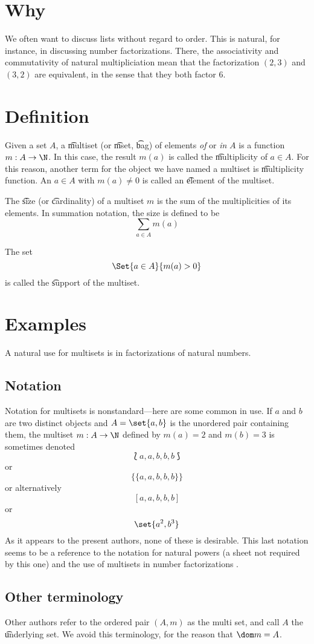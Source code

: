 
\section*{Why}

We often want to discuss lists without regard to order.
This is natural, for instance, in discussing number factorizations.
There, the associativity and commutativity of natural multipliciation mean that the factorization $(2, 3)$ and $(3,2)$ are equivalent, in the sense that they both factor 6.

\section*{Definition}

Given a set $A$, a \t{multiset} (or \t{mset}, \t{bag}) of elements \textit{of} or \textit{in} $A$ is a function $m: A \to \N  $.
In this case, the result $m(a)$ is called the \t{multiplicity} of $a \in A$.
For this reason, another term for the object we have named a multiset is \t{multiplicity function}.
An $a \in A$ with $m(a) \neq 0$ is called an \t{element} of the multiset.

The \t{size} (or \t{cardinality}) of a multiset $m$ is the sum of the multiplicities of its elements.
In summation notation, the size is defined to be
\[
\sum_{a \in A} m(a)
\]

The set
\[
\Set{a \in A}{m(a) > 0}
\]
is called the \t{support} of the multiset.

\section*{Examples}

A natural use for multisets is in factorizations of natural numbers.

\subsection*{Notation}

Notation for multisets is nonstandard---here are some common in use.
If $a$ and $b$ are two distinct objects and $A = \set{a, b}$ is the unordered pair containing them, the multiset $m: A \to \N  $ defined by $m(a) = 2$ and $m(b) = 3$ is sometimes denoted
\[
\lbag a,a,b,b,b \rbag
\]
or
\[
\{ \{ a,a,b,b,b\} \}
\]
or alternatively
\[
[a,a,b,b,b]
\]
or
\[
\set{a^2, b^3}
\]
As it appears to the present authors, none of these is desirable.
This last notation seems to be a reference to the notation for natural powers (a sheet not required by this one) and the use of multisets in number factorizations .

\subsection*{Other terminology}

Other authors refer to the ordered pair $(A, m)$ as the multi set, and call $A$ the \t{underlying set}.
We avoid this terminology, for the reason that $\dom m = A$.

\blankpage